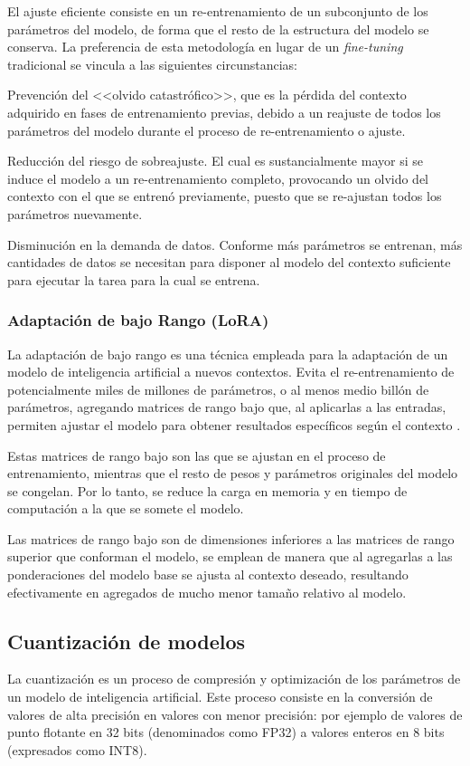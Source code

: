 \documentclass[12pt, a4paper, twoside]{article}
\begin{document}
El ajuste eficiente consiste en un re-entrenamiento de un subconjunto de los parámetros del modelo, de forma que el resto de la estructura del modelo se conserva. La preferencia de esta metodología en lugar de un \textit{fine-tuning} tradicional se vincula a las siguientes circunstancias:

Prevención del <<olvido catastrófico>>, que es la pérdida del contexto adquirido en fases de entrenamiento previas, debido a un reajuste de todos los parámetros del modelo durante el proceso de re-entrenamiento o ajuste.

Reducción del riesgo de sobreajuste. El cual es sustancialmente mayor si se induce el modelo a un re-entrenamiento completo, provocando un olvido del contexto con el que se entrenó previamente, puesto que se re-ajustan todos los parámetros nuevamente.

Disminución en la demanda de datos. Conforme más parámetros se entrenan, más cantidades de datos se necesitan para disponer al modelo del contexto suficiente para ejecutar la tarea para la cual se entrena.

\subsubsection{Adaptación de bajo Rango (LoRA)}
La adaptación de bajo rango es una técnica empleada para la adaptación de un modelo de inteligencia artificial a nuevos contextos. Evita el re-entrenamiento de potencialmente miles de millones de parámetros, o al menos medio billón de parámetros, agregando matrices de rango bajo que, al aplicarlas a las entradas, permiten ajustar el modelo para obtener resultados específicos según el contexto \cite{noble-2025}.

Estas matrices de rango bajo son las que se ajustan en el proceso de entrenamiento, mientras que el resto de pesos y parámetros originales del modelo se congelan. Por lo tanto, se reduce la carga en memoria y en tiempo de computación a la que se somete el modelo.

Las matrices de rango bajo son de dimensiones inferiores a las matrices de rango superior que conforman el modelo, se emplean de manera que al agregarlas a las ponderaciones del modelo base se ajusta al contexto deseado, resultando efectivamente en agregados de mucho menor tamaño relativo al modelo.

\subsection{Cuantización de modelos}
La cuantización es un proceso de compresión y optimización de los parámetros de un modelo de inteligencia artificial. Este proceso consiste en la conversión de valores de alta precisión en valores con menor precisión:  por ejemplo de valores de punto flotante en 32 bits (denominados como FP32) a valores enteros en 8 bits (expresados como INT8).
\end{document}
